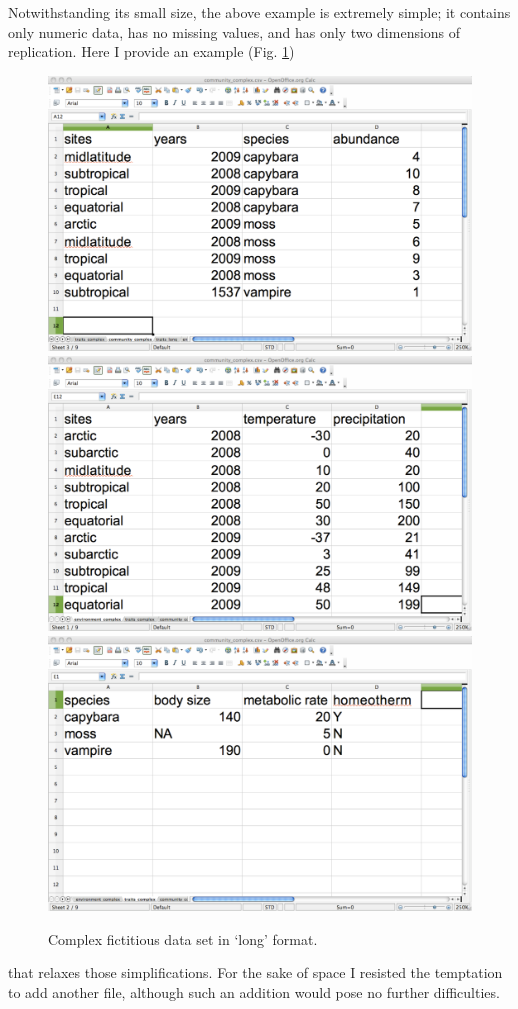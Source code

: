 \documentclass{article}
\numberwithin{exercise}{section}
\begin{document}
Notwithstanding its small size, the above example is extremely simple; it contains only numeric data, has no missing values, and has only two dimensions of replication.  Here I provide an example (Fig. \ref{fig:complexspreadsheet}) \begin{figure}
\label{fig:complexspreadsheet}
\includegraphics{./readingmultipletables/community_complex.pdf}
\includegraphics{./readingmultipletables/environment_complex.pdf}
\includegraphics{./readingmultipletables/traits_complex.pdf}
\caption{Complex fictitious data set in `long' format.}
\end{figure}that relaxes those simplifications.  For the sake of space I resisted the temptation to add another file, although such an addition would pose no further difficulties.
\end{document}
